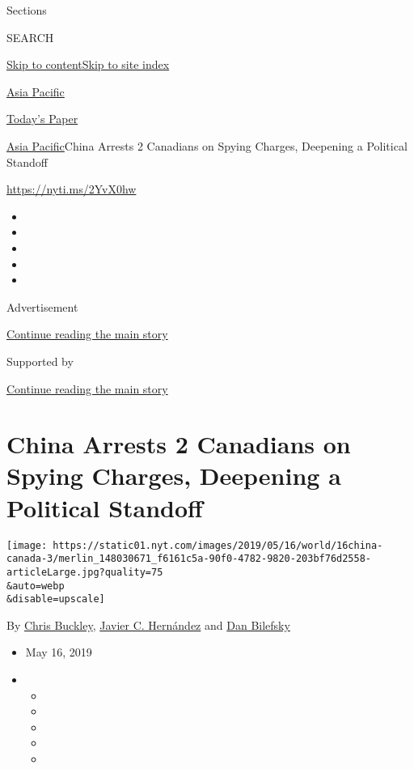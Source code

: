 Sections

SEARCH

\protect\hyperlink{site-content}{Skip to
content}\protect\hyperlink{site-index}{Skip to site index}

\href{https://www.nytimes.com/section/world/asia}{Asia Pacific}

\href{https://myaccount.nytimes.com/auth/login?response_type=cookie\&client_id=vi}{}

\href{https://www.nytimes.com/section/todayspaper}{Today's Paper}

\href{/section/world/asia}{Asia Pacific}\textbar{}China Arrests 2
Canadians on Spying Charges, Deepening a Political Standoff

\url{https://nyti.ms/2YvX0hw}

\begin{itemize}
\item
\item
\item
\item
\item
\end{itemize}

Advertisement

\protect\hyperlink{after-top}{Continue reading the main story}

Supported by

\protect\hyperlink{after-sponsor}{Continue reading the main story}

\hypertarget{china-arrests-2-canadians-on-spying-charges-deepening-a-political-standoff}{%
\section{China Arrests 2 Canadians on Spying Charges, Deepening a
Political
Standoff}\label{china-arrests-2-canadians-on-spying-charges-deepening-a-political-standoff}}

\texttt{[image: https://static01.nyt.com/images/2019/05/16/world/16china-canada-3/merlin\_148030671\_f6161c5a-90f0-4782-9820-203bf76d2558-articleLarge.jpg?quality=75\\\&auto=webp\\\&disable=upscale]}

By \href{https://www.nytimes.com/by/chris-buckley}{Chris Buckley},
\href{https://www.nytimes.com/by/javier-c-hernandez}{Javier C.
Hernández} and \href{https://www.nytimes.com/by/dan-bilefsky}{Dan
Bilefsky}

\begin{itemize}
\item
  May 16, 2019
\item
  \begin{itemize}
  \item
  \item
  \item
  \item
  \item
  \end{itemize}
\end{itemize}


